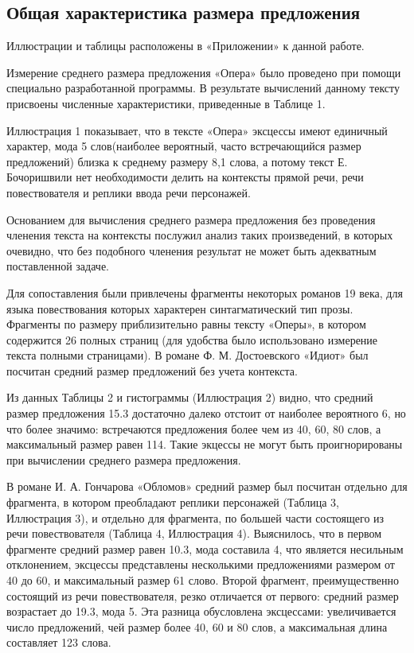 \documentclass{kursa4}
\begin{document}
      \subsection{Общая характеристика размера предложения}

      Иллюстрации и таблицы расположены в «Приложении» к данной работе.

          {Измерение среднего размера предложения «Опера» было проведено при помощи специально разработанной программы. В результате вычислений данному тексту присвоены численные характеристики, приведенные в Таблице 1.}

        

        {Иллюстрация 1 показывает, что в тексте «Опера» эксцессы имеют единичный характер, мода 5 слов(наиболее вероятный, часто встречающийся размер предложений) близка к среднему размеру 8,1 слова, а потому текст Е. Бочоришвили нет необходимости делить на контексты прямой речи, речи повествователя и реплики ввода речи персонажей. }

        {Основанием для вычисления среднего размера предложения без проведения членения текста на контексты послужил анализ таких произведений, в которых очевидно, что без подобного членения результат не может быть адекватным поставленной задаче. }

        Для сопоставления были привлечены фрагменты некоторых романов 19 века, для языка повествования которых характерен синтагматический тип прозы. Фрагменты по размеру приблизительно равны тексту «Оперы», в котором содержится 26 полных страниц (для удобства было использовано измерение текста полными страницами). В романе Ф. М. Достоевского «Идиот» был посчитан средний размер предложений без учета контекста. 

             
        Из данных Таблицы 2 и гистограммы (Иллюстрация 2) видно, что средний размер предложения 15.3 достаточно далеко отстоит от наиболее вероятного 6, но что более значимо: встречаются предложения более чем из 40, 60, 80 слов, а максимальный размер равен 114. Такие экцессы не могут быть проигнорированы при вычислении среднего размера предложения. 

        В романе И. А. Гончарова «Обломов» средний размер был посчитан отдельно для фрагмента, в котором преобладают реплики персонажей (Таблица 3, Иллюстрация 3), и отдельно для фрагмента, по большей части состоящего из речи повествователя (Таблица 4, Иллюстрация 4). Выяснилось, что в первом фрагменте средний размер равен 10.3, мода составила 4, что является несильным отклонением, эксцессы представлены несколькими предложениями размером от 40 до 60, и максимальный размер 61 слово. Второй фрагмент, преимущественно состоящий из речи повествователя, резко отличается от первого: средний размер возрастает до 19.3, мода 5. Эта разница обусловлена эксцессами: увеличивается число предложений, чей размер более 40, 60 и 80 слов, а максимальная длина составляет 123 слова. 
\end{document}
